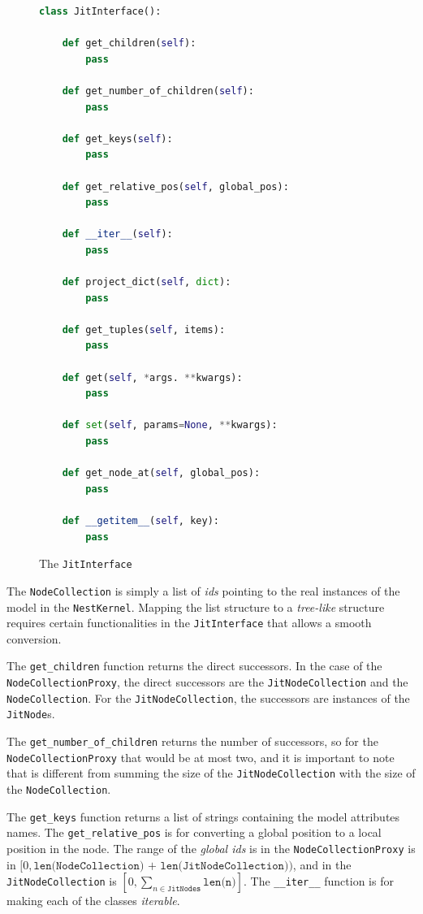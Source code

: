 \begin{figure}[ht!]
\centering
\begin{lstlisting}[language=Python, label=lst:jit_interface]
class JitInterface():

    def get_children(self):
        pass
        
    def get_number_of_children(self):
        pass
    
    def get_keys(self):
        pass
    
    def get_relative_pos(self, global_pos):
        pass
        
    def __iter__(self):
        pass
        
    def project_dict(self, dict):
        pass
    
    def get_tuples(self, items):
        pass
        
    def get(self, *args. **kwargs):
        pass
        
    def set(self, params=None, **kwargs):
        pass
    
    def get_node_at(self, global_pos):
        pass
        
    def __getitem__(self, key):
        pass
\end{lstlisting}
\caption{The \texttt{JitInterface}}
\end{figure}


The \texttt{NodeCollection} is simply a list of \emph{ids} pointing to the real instances of the model in the \texttt{NestKernel}. Mapping the list structure to a \emph{tree-like} structure requires certain functionalities in the \texttt{JitInterface} that allows a smooth conversion.

The \texttt{get\_children} function returns the direct successors. In the case of the \texttt{NodeCollectionProxy}, the direct successors are the \texttt{JitNodeCollection} and the \texttt{NodeCollection}. For the \texttt{JitNodeCollection}, the successors are instances of the \texttt{JitNode}s.

The \texttt{get\_number\_of\_children} returns the number of successors, so for the \texttt{NodeCollectionProxy} that would be at most two, and it is important to note that is different from summing the size of the \texttt{JitNodeCollection} with the size of the \texttt{NodeCollection}. 

The \texttt{get\_keys} function returns a list of strings containing the model attributes names. The \texttt{get\_relative\_pos} is for converting a global position to a local position in the node. The range of the \emph{global ids} is in the \texttt{NodeCollectionProxy} is in $[0, \texttt{len(NodeCollection) + len(JitNodeCollection)})$, and in the \texttt{JitNodeCollection} is $[0,\sum_{n \in \texttt{JitNodes}} \texttt{len(n)}]$. The \texttt{\_\_iter\_\_} function is for making each of the classes \emph{iterable}. 

